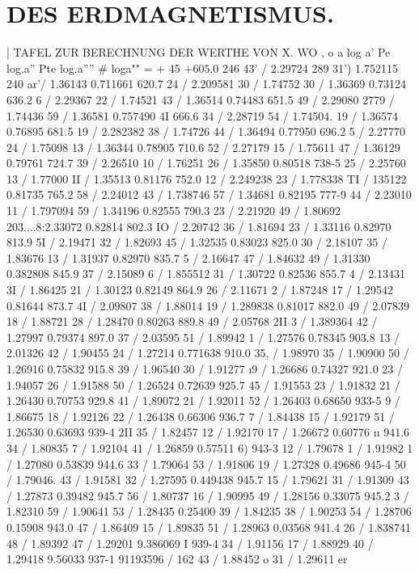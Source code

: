 \documentclass[12pt,a4paper]{article}
\begin{document}
\section*{DES ERDMAGNETISMUS.}
| TAFEL ZUR BERECHNUNG DER WERTHE VON X. WO \textdegree{} , o a\textdegree{} log a' Pe log.a'' Pte log.a'''' \# loga"" = + 45\textdegree{}
$+ 605.0$
246\textdegree{} 43' / 2.29724 289\textdegree{} 31') 1.752115 240\textdegree{} ar'/ 1.36143 0.711661 \textregistered{} 620.7 24 / 2.209581 30 / 1.74752 30 / 1.36369 0.73124 636.2 6 / 2.29367 22 / 1.74521 43 / 1.36514 0.74483 651.5 49 / 2.29080 2779 /  1.74436 59 / 1.36581 0.757490 4I 666.6 34 / 2.28719 54 / 1.74504. 19 / 1.36574 0.76895 681.5 19 / 2.282382 38 / 1.74726 44 / 1.36494 0.77950 696.2 5 / 2.27770 24 / 1.75098 13 / 1.36344 0.78905 710.6 52 / 2.27179 15 / 1.75611 47 / 1.36129 0.79761 724.7 39 / 2.26510 10 / 1.76251 26 / 1.35850 0.80518 738-5 25 / 2.25760 13 / 1.77000 II / 1.35513 0.81176 752.0 12 / 2.249238 23 / 1.778338 TI / 135122 0.81735 765.2 58 / 2.24012 43 / 1.738746 57 / 1.34681 0.82195 777-9 44 / 2.23010 11 / 1.797094 59 / 1.34196 0.82555 790.3 23 / 2.21920 49 / 1.80692 203....8:2.33072 0.82814 802.3 IO / 2.20742 36 / 1.81694 23 / 1.33116 0.82970 813.9 5I / 2.19471 32 / 1.82693 45 / 1.32535 0.83023 825.0 30 / 2.18107 35 / 1.83676 13 / 1.31937 0.82970 835.7 5 / 2.16647 47 / 1.84632 49 / 1.31330 0.382808 845.9 37 / 2.15089 6 /  1.855512 31 / 1.30722 0.82536 855.7 4 / 2.13431 3I / 1.86425 21 / 1.30123 0.82149 864.9 26 / 2.11671 2 / 1.87248 17 / 1.29542 0.81644 873.7 4I / 2.09807 38 / 1.88014 19 / 1.289838 0.81017 882.0 49 / 2.07839 18 / 1.88721 28 / 1.28470 0.80263 889.8 49 / 2.05768 2II 3 / 1.389364 42 / 1.27997 0.79374 897.0 37 / 2.03595 51 / 1.89942 1 / 1.27576 0.78345 903.8 13 / 2.01326 42 / 1.90455 24 / 1.27214 0.771638 910.0 35, / 1.98970 35 / 1.90900 50 / 1.26916 0.75832 915.8 39 / 1.96540 30 / 1.91277 \i{}9 / 1.26686 0.74327 921.0 23 / 1.94057 26 / 1.91588 50 / 1.26524 0.72639 925.7 45 / 1.91553 23 / 1.91832 21 / 1.26430 0.70753 929.8 41 / 1,89072 21 / 1.92011 52 / 1.26403 0.68650 933-5 9 / 1.86675 18 / 1.92126 22 / 1.26438 0.66306 936.7 7 / 1.84438 15 / 1.92179 51 / 1.26530 0.63693 939-4 2II 35 / 1.82457 12 / 1.92170 17 / 1.26672 0.60776 \i{}\i{} 941.6 34 / 1.80835 7 / 1.92104 41 / 1.26859 0.57511 6) 943-3 12 / 1.79678 1 / 1.91982 1 / 1.27080 0.53839 944.6 33 / 1.79064 53 / 1.91806 19 / 1.27328 0.49686 945-4 50 / 1.79046. 43 / 1.91581 32 / 1.27595 0.449438 945.7 15 / 1.79621 31 / 1.91309 43 / 1.27873 0.39482 945.7 56 / 1.80737 16 / 1.90995 49 / 1.28156 0.33075 945.2 3 / 1.82310 59 / 1.90641 53 / 1.28435 0.25400 39 / 1.84235 38 / 1.90253 54 / 1.28706 0.15908 943.0 47 / 1.86409 15 / 1.89835 51 / 1.28963 0.03568 941.4 26 / 1.838741 48 / 1.89392 47 / 1.29201 9.386069 I 939-4 34 / 1.91156 17 / 1.88929 40 / 1.29418 9.56033 937-1 91193596 / 162 43 / 1.88452 o 31 / 1.29611 er
\end{document}

